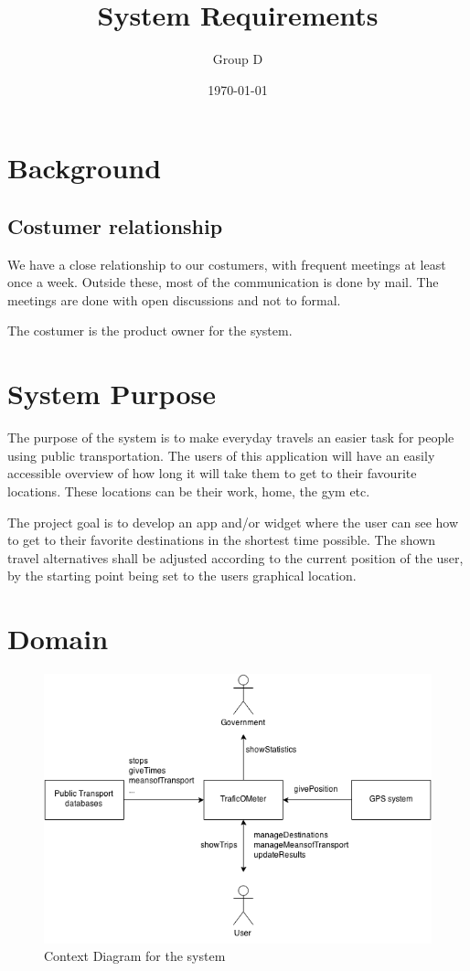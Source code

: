 \documentclass[a4paper]{article}
\title{System Requirements}
\author{Group D}
\date{\today}
\begin{document}
	\maketitle
	\thispagestyle{empty}
	\setcounter{page}{0}
	\pagebreak
	\tableofcontents
	\pagebreak
	



	\section{Background} %
	\label{sec:background}
	
		\subsection{Costumer relationship}
			We have a close relationship to our costumers, with frequent meetings at least once a week. Outside these, most of the communication is done by mail. The meetings are done with open discussions and not to formal. 

			The costumer is the product owner for the system.



	\section{System Purpose} %
	The purpose of the system is to make everyday travels an easier task for people using public transportation. The users of this application will have an easily accessible overview of how long it will take them to get to their favourite locations. These locations can be their work, home, the gym etc.
	
	
The project goal is to develop an app and/or widget where the user can see how to get to their favorite destinations in the shortest time possible. The shown travel alternatives shall be adjusted according to the current position of the user, by the starting point being set to the users graphical location.
	\section{Domain}
		\begin{figure}[h]
				\includegraphics[scale=0.65]{Context-v1.png}
			\caption{Context Diagram for the system}
		\end{figure}
\end{document}
